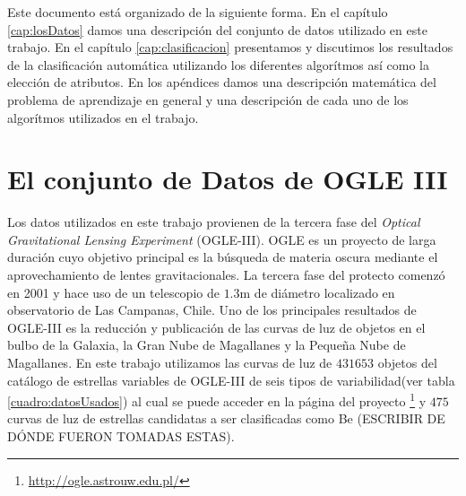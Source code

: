 \documentclass[letterpaper,12pt]{book}
\begin{document}
Este documento está organizado de la siguiente forma. En el capítulo \ref{cap:losDatos} damos una descripción del conjunto de datos utilizado en este trabajo. En el capítulo \ref{cap:clasificacion} presentamos y discutimos los resultados de la clasificación automática utilizando los diferentes algorítmos así como la elección de atributos. En los apéndices damos una descripción matemática del problema de aprendizaje en general y una descripción de cada uno de los algorítmos utilizados en el trabajo.




\chapter{El conjunto de Datos de OGLE III\label{cap:losDatos}}

Los datos utilizados en este trabajo provienen de la tercera fase del \textit{Optical Gravitational Lensing Experiment} (OGLE-III). OGLE es un proyecto de larga duración cuyo objetivo principal es la búsqueda de materia oscura mediante el aprovechamiento de lentes gravitacionales. La tercera fase del protecto comenzó en 2001 y hace uso de un telescopio de $1.3$m de diámetro localizado en observatorio de Las Campanas, Chile\cite{udalski_optical_2004}. Uno de los principales resultados de OGLE-III es la reducción\cite{udalski_optical_2008} y publicación de las curvas de luz de objetos en el bulbo de la Galaxia, la Gran Nube de Magallanes y la Pequeña Nube de Magallanes. En este trabajo utilizamos las curvas de luz de $431 653$ objetos del catálogo de estrellas variables de OGLE-III de seis tipos de variabilidad(ver tabla \ref{cuadro:datosUsados}) al cual se puede acceder en la página del proyecto \footnote{\url{http://ogle.astrouw.edu.pl/}} y $475$ curvas de luz de estrellas candidatas a ser clasificadas como Be (ESCRIBIR DE DÓNDE FUERON TOMADAS ESTAS).
\end{document}

